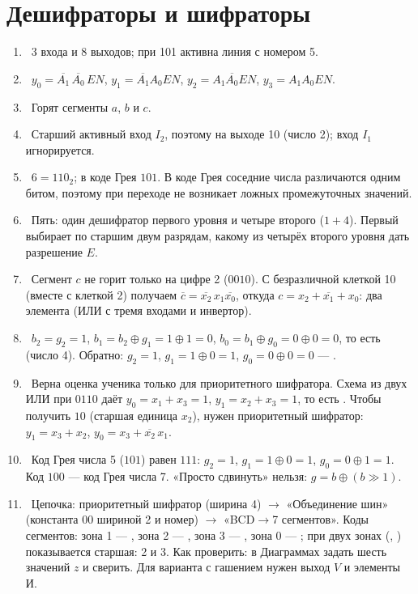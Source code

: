 \section*{Дешифраторы и шифраторы}
\begin{enumerate}
  \item {}~3 входа и 8 выходов; при 101 активна линия с номером 5.
  \item {}~$y_0=\overline{A_1}\,\overline{A_0}\,EN$, $y_1=\overline{A_1}A_0 EN$, $y_2=A_1\overline{A_0}EN$, $y_3=A_1A_0EN$.
  \item {}~Горят сегменты $a$, $b$ и $c$.
  \item {}~Старший активный вход $I_2$, поэтому на выходе 10 (число 2); вход $I_1$ игнорируется.
  \item {}~$6=110_2$; в коде Грея $101$. В коде Грея соседние числа различаются одним битом, поэтому при переходе не возникает ложных промежуточных значений.
  \item {}~Пять: один дешифратор первого уровня и четыре второго ($1+4$). Первый выбирает по старшим двум разрядам, какому из четырёх второго уровня дать разрешение $E$.
  \item {}~Сегмент $c$ не горит только на цифре 2 ($0010$). С безразличной клеткой 10 (вместе с клеткой 2) получаем $\overline{c}=\overline{x_2}\,x_1\overline{x_0}$, откуда $c=x_2+\overline{x_1}+x_0$: два элемента (ИЛИ с тремя входами и инвертор).
  \item {}~$b_2=g_2=1$, $b_1=b_2\oplus g_1=1\oplus1=0$, $b_0=b_1\oplus g_0=0\oplus0=0$, то есть  (число 4). Обратно: $g_2=1$, $g_1=1\oplus0=1$, $g_0=0\oplus0=0$ --- .
  \item {}~Верна оценка ученика только для приоритетного шифратора. Схема из двух ИЛИ при $0110$ даёт $y_0=x_1+x_3=1$, $y_1=x_2+x_3=1$, то есть . Чтобы получить $10$ (старшая единица $x_2$), нужен приоритетный шифратор: $y_1=x_3+x_2$, $y_0=x_3+\overline{x_2}\,x_1$.
  \item {}~Код Грея числа 5 ($101$) равен $111$: $g_2=1$, $g_1=1\oplus0=1$, $g_0=0\oplus1=1$. Код $100$ --- код Грея числа 7. «Просто сдвинуть» нельзя: $g=b\oplus(b\gg1)$.
  \item {}~Цепочка: приоритетный шифратор (ширина 4) $\to$ «Объединение шин» (константа $00$ шириной 2 и номер) $\to$ «BCD$\to$7 сегментов». Коды сегментов: зона 1 --- , зона 2 --- , зона 3 --- , зона 0 --- ; при двух зонах (, ) показывается старшая: 2 и 3. Как проверить: в Диаграммах задать шесть значений $z$ и сверить. Для варианта с гашением нужен выход $V$ и элементы И.

\end{enumerate}
